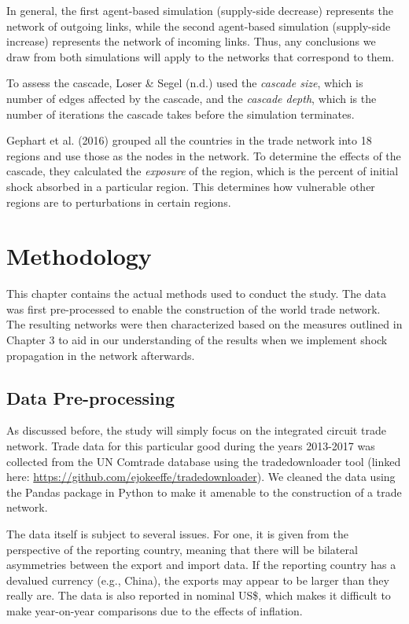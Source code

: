 \documentclass[12pt,letterpaper]{report}
\begin{document}
	In general, the first agent-based simulation (supply-side decrease) represents the network of outgoing links, while the second agent-based simulation (supply-side increase) represents the network of incoming links. Thus, any conclusions we draw from both simulations will apply to the networks that correspond to them.
	
	To assess the cascade, Loser \& Segel (n.d.) used the \textit{cascade size}, which is number of edges affected by the cascade, and the \textit{cascade depth}, which is the number of iterations the cascade takes before the simulation terminates.
	
	Gephart et al. (2016) grouped all the countries in the trade network into 18 regions and use those as the nodes in the network. To determine the effects of the cascade, they calculated the \textit{exposure} of the region, which is the percent of initial shock absorbed in a particular region. This determines how vulnerable other regions are to perturbations in certain regions.

\chapter{Methodology}
\label{chap:4Methodology}

This chapter contains the actual methods used to conduct the study. The data was first pre-processed to enable the construction of the world trade network. The resulting networks were then characterized based on the measures outlined in Chapter 3 to aid in our understanding of the results when we implement shock propagation in the network afterwards. 

	\section{Data Pre-processing}
	\label{sec:41dataPreprocessing}
	
	As discussed before, the study will simply focus on the integrated circuit trade network. Trade data for this particular good during the years 2013-2017 was collected from the UN Comtrade database using the tradedownloader tool (linked here: \underline{https://github.com/ejokeeffe/tradedownloader}). We cleaned the data using the Pandas package in Python to make it amenable to the construction of a trade network. 
	
	The data itself is subject to several issues. For one, it is given from the perspective of the reporting country, meaning that there will be bilateral asymmetries between the export and import data. If the reporting country has a devalued currency (e.g., China), the exports may appear to be larger than they really are. The data is also reported in nominal US\$, which makes it difficult to make year-on-year comparisons due to the effects of inflation. 
	
\end{document}
